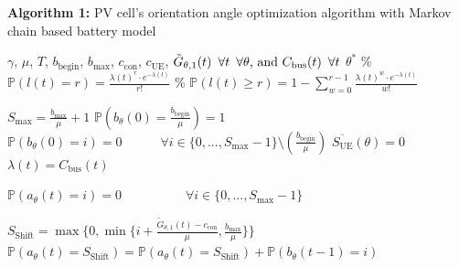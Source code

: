 \begin{breakablealgorithm}                
\caption{\textbf{Algorithm 1: } PV cell's orientation angle optimization algorithm with Markov chain based battery model\label{mar}}   \singlespacing                       
\begin{algorithmic} [1]                 
    \Require $\gamma$, $\mu$, $T$, $b_{\mathrm{begin}}$, $b_{\max}$, $c_{\mathrm{con}}$, $c_{\mathrm{UE}}$, $\tilde{G}_{\theta,1}(t) \enskip \forall t\enskip\forall \theta  \text{, and } C_{\mathrm{bus}}(t) \enskip \forall t$  
   \Ensure $\theta^*$
	\State \% $\mathbb{P}(l(t)=r)=\frac{\lambda(t)^r \cdot e^{-\lambda(t)}}{r!}$ \label{in1}
	\State \% $\mathbb{P}(l(t)\geq r)=1 - \sum_{w=0}^{r-1}\frac{\lambda(t)^w\cdot e^{-\lambda(t)}}{w!}$ \label{in2}
	\item[]
	\item[]
	\State {} \label{ini1} 		
	\State $S_{\mathrm{max}}=\frac{b_{\max}}{\mu}+1$\label{battery_stages}
		\State $\mathbb{P}(b_\theta(0)=\frac{b_{\mathrm{begin}}}{ \mu})=1$ \label{ini1_mar}
\State $\mathbb{P}(b_\theta(0)=i)=0 \quad \quad \quad \forall i \in \{0,...,S_{\mathrm{max}}-1\} \setminus  (\frac{b_{\mathrm{begin}}}{ \mu})$ \label{ini2_mar}
\State $\overline{S_{\mathrm{UE}}}(\theta)=0$\label{sss}
		\State $\lambda(t)=C_{\mathrm{bus}}(t) $\label{c_mar}
	\EndFor
		\item[]

		
		\State {}\label{gen1}  
		
	\State $\mathbb{P}(a_\theta(t)=i)=0\quad \quad \quad\quad \quad \forall i \in \{0,...,S_{\mathrm{max}}-1\}\quad$ \label{a_ini}
		
		\State $S_{\mathrm{Shift}}=\max\{0,\min\{i+\frac{\tilde{G}_{\theta,1}(t)-c_{\mathrm{con}}}{\mu},\frac{b_{\mathrm{max}}}{\mu}\}\}$\label{she}
		\State $\mathbb{P}(a_\theta(t)=S_{\mathrm{Shift}})=\mathbb{P}(a_\theta(t)=S_{\mathrm{Shift}})+\mathbb{P}(b_\theta(t-1)=i)$\label{shift}
		\EndFor
		

\end{algorithmic}
\end{breakablealgorithm}
